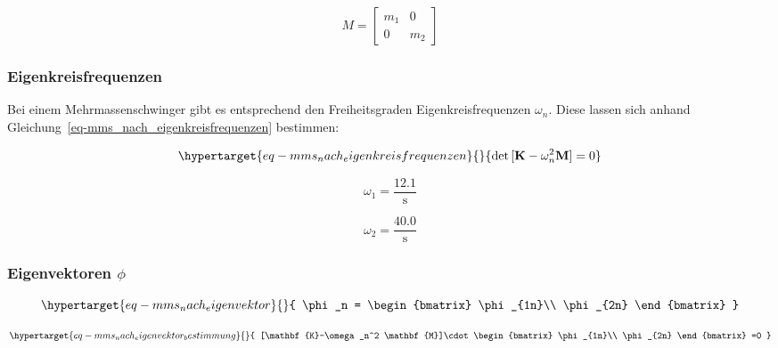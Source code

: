 \documentclass[
  letterpaper,
  DIV=11]{scrreprt}
\begin{document}
\begin{equation}M = \left[\begin{matrix}m_{1} & 0\\0 & m_{2}\end{matrix}\right]\end{equation}

\hypertarget{eigenkreisfrequenzen-2}{%
\subsubsection{Eigenkreisfrequenzen}\label{eigenkreisfrequenzen-2}}

Bei einem Mehrmassenschwinger gibt es entsprechend den Freiheitsgraden
Eigenkreisfrequenzen \(\omega_n\). Diese lassen sich anhand
Gleichung~\ref{eq-mms_nach_eigenkreisfrequenzen} bestimmen:

\begin{equation}\protect\hypertarget{eq-mms_nach_eigenkreisfrequenzen}{}{
\det{[\mathbf{K}-\omega_n^2 \mathbf{M}]=0}
}\label{eq-mms_nach_eigenkreisfrequenzen}\end{equation}

\begin{equation}\omega_{1} = \frac{12.1}{\text{s}}\end{equation}

\begin{equation}\omega_{2} = \frac{40.0}{\text{s}}\end{equation}

\hypertarget{eigenvektoren-phi-1}{%
\subsubsection{\texorpdfstring{Eigenvektoren
\(\phi\)}{Eigenvektoren \textbackslash phi}}\label{eigenvektoren-phi-1}}

\begin{equation}\protect\hypertarget{eq-mms_nach_eigenvektor}{}{
\phi_n = \begin{bmatrix}
\phi_{1n}\\
\phi_{2n} 
\end{bmatrix}
}\label{eq-mms_nach_eigenvektor}\end{equation}

\begin{equation}\protect\hypertarget{eq-mms_nach_eigenvektor_bestimmung}{}{
[\mathbf{K}-\omega_n^2 \mathbf{M}]\cdot \begin{bmatrix}
\phi_{1n}\\
\phi_{2n} 
\end{bmatrix}
=0
}\label{eq-mms_nach_eigenvektor_bestimmung}\end{equation}
\end{document}
